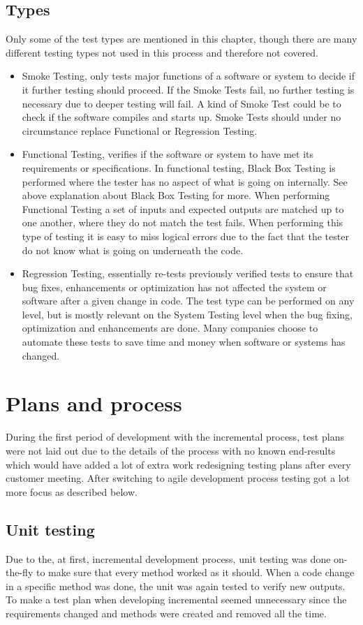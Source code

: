 \subsection{Types}
Only some of the test types are mentioned in this chapter, though there are many different testing types not used in this process and therefore not covered.
\begin{itemize}
\item Smoke Testing, only tests major functions of a software or system to decide if it further testing should proceed. If the Smoke Tests fail, no further testing is necessary due to deeper testing will fail. A kind of Smoke Test could be to check if the software compiles and starts up. Smoke Tests should under no circumstance replace Functional or Regression Testing.
\item Functional Testing, verifies if the software or system to have met its requirements or specifications. In functional testing, Black Box Testing is performed where the tester has no aspect of what is going on internally. See above explanation about Black Box Testing for more. When performing Functional Testing a set of inputs and expected outputs are matched up to one another, where they do not match the test fails. When performing this type of testing it is easy to miss logical errors due to the fact that the tester do not know what is going on underneath the code.
\item Regression Testing, essentially re-tests previously verified tests to ensure that bug fixes, enhancements or optimization has not affected the system or software after a given change in code. The test type can be performed on any level, but is mostly relevant on the System Testing level when the bug fixing, optimization and enhancements are done. Many companies choose to automate these tests to save time and money when software or systems has changed.
\end{itemize}
\section{Plans and process}
During the first period of development with the incremental process, test plans were not laid out due to the details of the process with no known end-results which would have added a lot of extra work redesigning testing plans after every customer meeting. After switching to agile development process testing got a lot more focus as described below.
\subsection{Unit testing}
Due to the, at first, incremental development process, unit testing was done on-the-fly to make sure that every method worked as it should. When a code change in a specific method was done, the unit was again tested to verify new outputs. To make a test plan when developing incremental seemed unnecessary since the requirements changed and methods were created and removed all the time.

